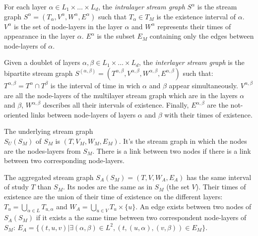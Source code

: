 \documentclass{svproc}
\begin{document}
\begin{definition}
	For each layer $\alpha \in L_1 \times \dots \times L_d$, the {\em intralayer stream graph} $S^{\alpha}$ is the stream graph $S^{\alpha}=(T_{\alpha},V^{\alpha},W^{\alpha},E^{\alpha})$ such that $ T_{\alpha} \in T_M$ is the existence interval of $\alpha$. $V^{\alpha}$ is the set of node-layers in the layer $\alpha$ and $W^{\alpha}$ represents their times of appearance in the layer $\alpha$. $E^{\alpha}$ is the subset $E_M$ containing only the edges between node-layers of $\alpha$.
	\end{definition}


	\begin{definition}
	Given a doublet of layers $\alpha, \beta \in L_1\times \dots\times L_d$, the {\em interlayer stream graph} is the bipartite stream graph $S^{(\alpha,\beta)} = (T^{\alpha,\beta}, V^{\alpha,\beta},W^{\alpha,\beta},E^{\alpha,\beta})$ such that: $T^{\alpha,\beta}=T^{\alpha}\cap T^{\beta}$ is the interval of time in wich $\alpha$ and $\beta$ appear simultaneously. $V^{\alpha,\beta}$ are all the node-layers of the multilayer stream graph which are in the layers $\alpha$ and $\beta$, $W^{\alpha,\beta}$ describes all their intervals of existence. Finally, $E^{\alpha,\beta}$ are the not-oriented links between node-layers of layers $\alpha$ and $\beta$ with their times of existence.
	\end{definition}

\begin{definition}
	The underlying stream graph \\$S_U(S_M)$ of $S_M$ is  $(T,V_M,W_M,E_M)$. It's the stream graph in which the nodes are the nodes-layers from $S_M$. There is a link between two nodes if there is a link between two corresponding node-layers.
\end{definition}

	\begin{definition}

		The aggregated stream graph $S_A(S_M)=(T,V,W_A,E_A)$ has the same interval of study $T$ than $S_M$. Its nodes are the same as in $S_M$ (the set $V$). Their times of existence are the union of their time of existence on the different layers: $T_u = \bigcup_{\alpha \in L} T_{u,\alpha}$ and $W_A=\bigcup_{u\in V} T_u\times\{u\}$. An edge exists between two nodes of $S_A(S_M)$ if it exists a the same time between two correspondent node-layers of $S_M$:  $E_A = \{(t,u,v)| \exists (\alpha,\beta) \in L^2, (t,(u,\alpha),(v,\beta)) \in E_M \}$.
	\end{definition}
\end{document}
